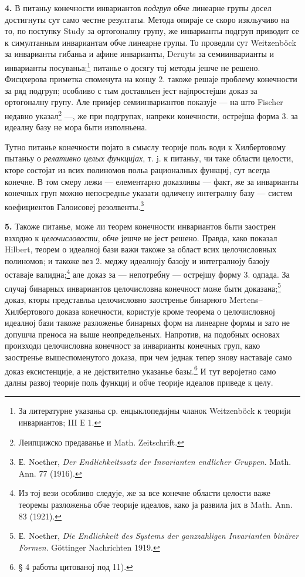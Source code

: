 ﻿\documentclass[11pt]{article}
\begin{document}
\textbf{4.} В питаньу конечности инвариантов \emph{подгруп} обче линеарне групы досел достигнуты сут само честне резултаты. Метода опираје се скоро изкльучиво на то, по поступку Study за ортогоналну групу, же инварианты подгруп приводит се к симултанным инвариантам обче линеарне групы. То проведли сут Weitzenböck за инварианты гибаньа и афине инварианты, Deruyts за семиинварианты и инварианты посуваньа;\footnote{За литературне указаньа ср. енцыклопедијны чланок Weitzenböck к теорији инвариантов; III Е 1.} питанье о досягу тој методы јешче не решено. Фисцхерова приметка споменута на концу 2. такоже решаје проблему конечности за ряд подгруп; особливо с тым доставльен јест најпростејши доказ за ортогоналну групу. Але примјер семиинвариантов показује --- на што Fischer недавно указал\footnote{Леипцижско предаванье и Math. Zeitschrift.} ---, же при подгрупах, напреки конечности, острејша форма 3. за идеалну базу не мора быти изполньена.

Тутно питанье конечности појато в смыслу теорије поль води к Хилбертовому пытаньу о \emph{релативно целых функцијах}, т. j. к питаньу, чи таке области целости, кторе состојат из всих полиномов польа рационалных функциј, сут всегда конечне. В том смеру лежи --- елементарно доказливы --- факт, же за инварианты конечных груп можно непосреднье указати одличену интегралну базу --- систем коефициентов Галоисовеј резолвенты.\footnote{Е. Noether, \emph{Der Endlichkeitssatz der Invarianten endlicher Gruppen}. Math. Ann. 77 (1916).}

\textbf{5.} Такоже питанье, може ли теорем конечности инвариантов быти заострен взходно к \emph{целочисловости}, обче јешче не јест решено. Правда, како показал Hilbert, теорем о идеалној бази важи такоже за област всих целочисловных полиномов; и такоже вез 2. меджу идеалноју базоју и интегралноју базоју оставаје валидна;\footnote{Из тој вези особливо следује, же за все конечне области целости важе теоремы разложеньа обче теорије идеалов, како ја развила јих в Math. Ann. 83 (1921).} але доказ за --- непотребну --- острејшу форму 3. одпада. За случај бинарных инвариантов целочисловна конечност може быти доказана;\footnote{Е. Noether, \emph{Die Endlichkeit des Systems der ganzzahligen Invarianten binärer Formen}. Göttinger Nachrichten 1919.} доказ, кторы представльа целочисловно заостренье бинарного Mertens--Хилбертового доказа конечности, користује кроме теорема о целочисловној идеалној бази такоже разложенье бинарных форм на линеарне формы и зато не допушча преноса на выше неопредельеных. Напротив, на подобных основах произходи целочисловна конечност за инварианты конечных груп, како заостренье вышеспоменутого доказа, при чем једнак тепер знову наставаје само доказ ексистенције, а не дејствително указанье базы.\footnote{§ 4 работы цитованој под 11).} И тут веројетно само далны развој теорије поль функциј и обче теорије идеалов приведе к целу.
\end{document}
